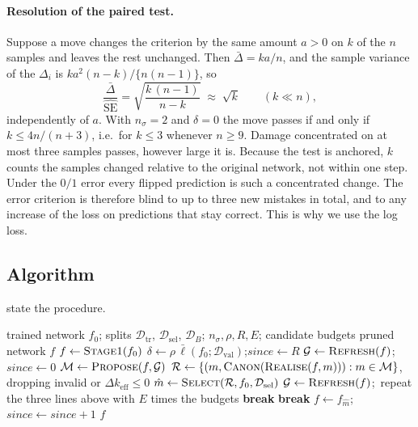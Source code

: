 \documentclass[11pt,a4paper]{article}
\theoremstyle{definition}
\newcommand{\D}{\mathcal{D}}
\newcommand{\keff}{k_{\mathrm{eff}}}
\newcommand{\Dtr}{\D_{\mathrm{tr}}}
\newcommand{\Dsel}{\D_{\mathrm{sel}}}
\newcommand{\DB}{\D_{B}}
\newcommand{\Mv}{\mathcal{M}}
\newcommand{\dbar}{\bar{\Delta}}
\newcommand{\sehat}{\widehat{\mathrm{SE}}}
\begin{document}
\paragraph{Resolution of the paired test.} Suppose a move changes the criterion by the
same amount $a>0$ on $k$ of the $n$ samples and leaves the rest unchanged. Then
$\dbar=ka/n$, and the sample variance of the $\Delta_i$ is $ka^2(n-k)/\{n(n-1)\}$, so
\begin{equation}
\frac{\dbar}{\sehat}=\sqrt{\frac{k\,(n-1)}{n-k}}\;\approx\;\sqrt{k}\qquad(k\ll n),
\label{eq:resolution}
\end{equation}
independently of $a$. With $n_\sigma=2$ and $\delta=0$ the move passes if and only if
$k\le4n/(n+3)$, i.e.\ for $k\le3$ whenever $n\ge9$. Damage concentrated on at most three
samples passes, however large it is. Because the test is anchored, $k$ counts the samples
changed relative to the original network, not within one step. Under the $0/1$ error
every flipped prediction is such a concentrated change. The error criterion is therefore
blind to up to three new mistakes in total, and to any increase of the loss on
predictions that stay correct. This is why we use the log loss.

\subsection{Algorithm}
\label{sec:algorithm}

 state the procedure.

\begin{algorithm}[t]
\caption{\textsc{BoundaryPrune} --- main loop}
\label{alg:main}
\begin{algorithmic}[1]
\Require trained network $f_0$; splits $\Dtr$, $\Dsel$, $\DB$; $n_\sigma,\rho,R,E$; candidate budgets
\Ensure pruned network $f$
\State $f\gets\textsc{Stage1}(f_0)$ 
\State $\delta\gets\rho\,\bar\ell(f_0;\D_{\mathrm{val}})$;\quad $\mathit{since}\gets R$
\Loop
   $\mathcal{G}\gets\textsc{Refresh}(f)$;\ $\mathit{since}\gets0$
  \EndIf
  \State $\Mv\gets\textsc{Propose}(f,\mathcal{G})$ 
  \State $\mathcal{R}\gets\{(m,\textsc{Canon}(\textsc{Realise}(f,m))):m\in\Mv\}$, dropping invalid or $\Delta\keff\le0$
  \State $\hat m\gets\textsc{Select}(\mathcal{R},f_0,\Dsel)$ 
     \State $\mathcal{G}\gets\textsc{Refresh}(f)$;\ repeat the three lines above with $E$ times the budgets
      \textbf{break} \EndIf
  \EndIf
  \If{$\neg\,\textsc{StopTest}(f_{\hat m},f_0,\DB,\delta)$} \textbf{break} \EndIf
  \State $f\gets f_{\hat m}$;\quad $\mathit{since}\gets\mathit{since}+1$
\EndLoop
\State \Return $f$
\end{algorithmic}
\end{algorithm}
\end{document}
